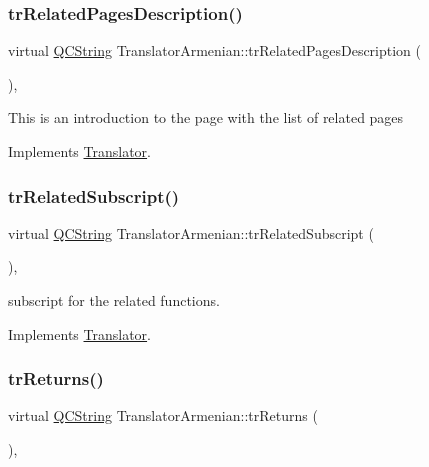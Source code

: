 \subsubsection{\texorpdfstring{trRelatedPagesDescription()}{trRelatedPagesDescription()}}
{\footnotesize\ttfamily virtual \mbox{\hyperlink{class_q_c_string}{Q\+C\+String}} Translator\+Armenian\+::tr\+Related\+Pages\+Description (\begin{DoxyParamCaption}{ }\end{DoxyParamCaption})\hspace{0.3cm}{\ttfamily [inline]}, {\ttfamily [virtual]}}

This is an introduction to the page with the list of related pages 

Implements \mbox{\hyperlink{class_translator}{Translator}}.

\mbox{\label{class_translator_armenian_a57df32a3fbca8e9246dbd314908793a5}} 
\subsubsection{\texorpdfstring{trRelatedSubscript()}{trRelatedSubscript()}}
{\footnotesize\ttfamily virtual \mbox{\hyperlink{class_q_c_string}{Q\+C\+String}} Translator\+Armenian\+::tr\+Related\+Subscript (\begin{DoxyParamCaption}{ }\end{DoxyParamCaption})\hspace{0.3cm}{\ttfamily [inline]}, {\ttfamily [virtual]}}

subscript for the related functions. 

Implements \mbox{\hyperlink{class_translator}{Translator}}.

\mbox{\label{class_translator_armenian_a1464200fb35f21f51ac33c941b81284a}} 
\subsubsection{\texorpdfstring{trReturns()}{trReturns()}}
{\footnotesize\ttfamily virtual \mbox{\hyperlink{class_q_c_string}{Q\+C\+String}} Translator\+Armenian\+::tr\+Returns (\begin{DoxyParamCaption}{ }\end{DoxyParamCaption})\hspace{0.3cm}{\ttfamily [inline]}, {\ttfamily [virtual]}}

